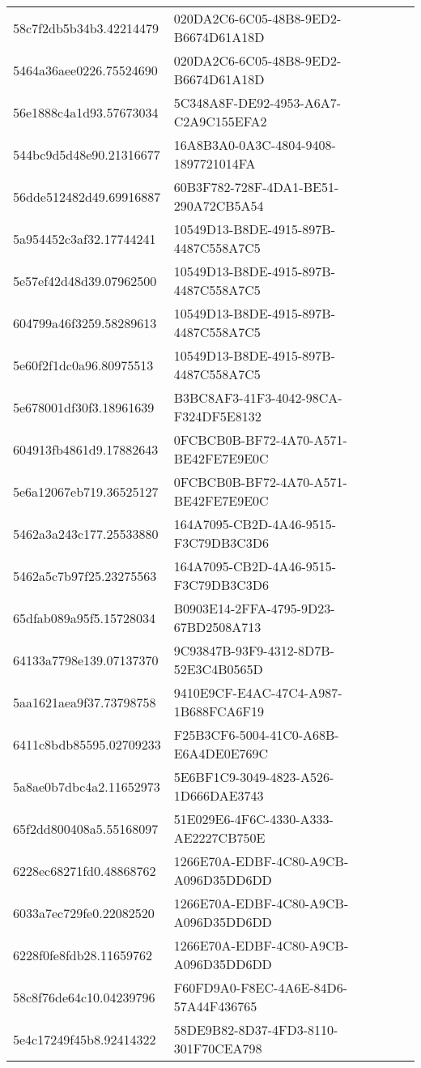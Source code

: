 \begin{tabular}{ll}
58c7f2db5b34b3.42214479 & 020DA2C6-6C05-48B8-9ED2-B6674D61A18D \\
5464a36aee0226.75524690 & 020DA2C6-6C05-48B8-9ED2-B6674D61A18D \\
56e1888c4a1d93.57673034 & 5C348A8F-DE92-4953-A6A7-C2A9C155EFA2 \\
544bc9d5d48e90.21316677 & 16A8B3A0-0A3C-4804-9408-1897721014FA \\
56dde512482d49.69916887 & 60B3F782-728F-4DA1-BE51-290A72CB5A54 \\
5a954452c3af32.17744241 & 10549D13-B8DE-4915-897B-4487C558A7C5 \\
5e57ef42d48d39.07962500 & 10549D13-B8DE-4915-897B-4487C558A7C5 \\
604799a46f3259.58289613 & 10549D13-B8DE-4915-897B-4487C558A7C5 \\
5e60f2f1dc0a96.80975513 & 10549D13-B8DE-4915-897B-4487C558A7C5 \\
5e678001df30f3.18961639 & B3BC8AF3-41F3-4042-98CA-F324DF5E8132 \\
604913fb4861d9.17882643 & 0FCBCB0B-BF72-4A70-A571-BE42FE7E9E0C \\
5e6a12067eb719.36525127 & 0FCBCB0B-BF72-4A70-A571-BE42FE7E9E0C \\
5462a3a243c177.25533880 & 164A7095-CB2D-4A46-9515-F3C79DB3C3D6 \\
5462a5c7b97f25.23275563 & 164A7095-CB2D-4A46-9515-F3C79DB3C3D6 \\
65dfab089a95f5.15728034 & B0903E14-2FFA-4795-9D23-67BD2508A713 \\
64133a7798e139.07137370 & 9C93847B-93F9-4312-8D7B-52E3C4B0565D \\
5aa1621aea9f37.73798758 & 9410E9CF-E4AC-47C4-A987-1B688FCA6F19 \\
6411c8bdb85595.02709233 & F25B3CF6-5004-41C0-A68B-E6A4DE0E769C \\
5a8ae0b7dbc4a2.11652973 & 5E6BF1C9-3049-4823-A526-1D666DAE3743 \\
65f2dd800408a5.55168097 & 51E029E6-4F6C-4330-A333-AE2227CB750E \\
6228ec68271fd0.48868762 & 1266E70A-EDBF-4C80-A9CB-A096D35DD6DD \\
6033a7ec729fe0.22082520 & 1266E70A-EDBF-4C80-A9CB-A096D35DD6DD \\
6228f0fe8fdb28.11659762 & 1266E70A-EDBF-4C80-A9CB-A096D35DD6DD \\
58c8f76de64c10.04239796 & F60FD9A0-F8EC-4A6E-84D6-57A44F436765 \\
5e4c17249f45b8.92414322 & 58DE9B82-8D37-4FD3-8110-301F70CEA798 \\

\end{tabular}
